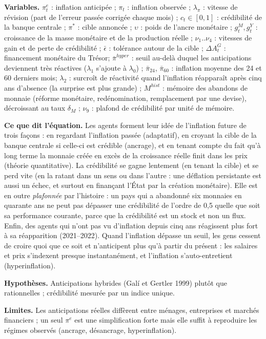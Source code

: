 \documentclass[11pt,a4paper]{article}
\newcommand{\variables}{\par\noindent\textbf{Variables.} }
\newcommand{\sens}{\par\noindent\textbf{Ce que dit l'équation.} }
\newcommand{\hyp}{\par\noindent\textbf{Hypothèses.} }
\newcommand{\limites}{\par\noindent\textbf{Limites.} }
\begin{document}
\begin{lecture}
\variables $\pi^e_t$ : inflation anticipée ; $\pi_t$ : inflation observée ; $\lambda_\pi$ : vitesse de révision (part de l'erreur passée corrigée chaque mois) ; $c_t\in[0,1]$ : crédibilité de la banque centrale ; $\pi^\ast$ : cible annoncée ; $\upsilon$ : poids de l'ancre monétaire ; $g^M_t, g^Y_t$ : croissance de la masse monétaire et de la production réelle ; $\nu_1..\nu_4$ : vitesses de gain et de perte de crédibilité ; $\bar\epsilon$ : tolérance autour de la cible ; $\Delta A^G_t$ : financement monétaire du Trésor; $\bar\pi^{hyper}$ : seuil au-delà duquel les anticipations deviennent très réactives ($\lambda_1$ s'ajoute à $\lambda_0$) ; $\bar\pi_{24}$, $\bar\pi_{60}$ : inflation moyenne des 24 et 60 derniers mois; $\lambda_2$ : surcroît de réactivité quand l'inflation réapparaît après cinq ans d'absence (la surprise est plus grande) ; $M^{hist}$ : mémoire des abandons de monnaie (réforme monétaire, redénomination, remplacement par une devise), décroissant au taux $\delta_M$ ; $\nu_9$ : plafond de crédibilité par unité de mémoire.
\sens Les agents forment leur idée de l'inflation future de trois façons : en regardant l'inflation passée (adaptatif), en croyant la cible de la banque centrale si celle-ci est crédible (ancrage), et en tenant compte du fait qu'à long terme la monnaie créée en excès de la croissance réelle finit dans les prix (théorie quantitative). La crédibilité se gagne lentement (en tenant la cible) et se perd vite (en la ratant dans un sens ou dans l'autre : une déflation persistante est aussi un échec, et surtout en finançant l'État par la création monétaire). Elle est en outre \emph{plafonnée} par l'histoire : un pays qui a abandonné six monnaies en quarante ans ne peut pas dépasser une crédibilité de l'ordre de 0,5 quelle que soit sa performance courante, parce que la crédibilité est un stock et non un flux. Enfin, des agents qui n'ont pas vu d'inflation depuis cinq ans réagissent plus fort à sa réapparition (2021--2022). Quand l'inflation dépasse un seuil, les gens cessent de croire quoi que ce soit et n'anticipent plus qu'à partir du présent : les salaires et prix s'indexent presque instantanément, et l'inflation s'auto-entretient (hyperinflation).
\hyp Anticipations hybrides (Galí et Gertler 1999) plutôt que rationnelles ; crédibilité mesurée par un indice unique.
\limites Les anticipations réelles diffèrent entre ménages, entreprises et marchés financiers ; un seul $\pi^e$ est une simplification forte mais elle suffit à reproduire les régimes observés (ancrage, désancrage, hyperinflation).
\end{lecture}
\end{document}
